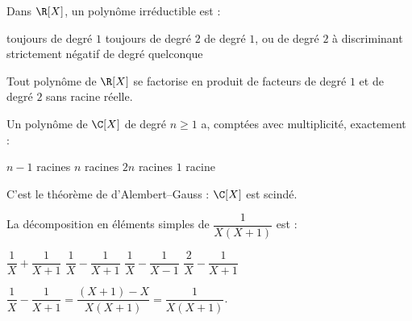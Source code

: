 \begin{question}
Dans $\R[X]$, un polynôme irréductible est :
\begin{reponses}
  \mauvaise toujours de degré $1$
  \mauvaise toujours de degré $2$
  \bonne de degré $1$, ou de degré $2$ à discriminant strictement négatif
  \mauvaise de degré quelconque
\end{reponses}
\begin{explication}
Tout polynôme de $\R[X]$ se factorise en produit de facteurs de degré $1$ et de degré $2$ sans racine réelle.
\end{explication}
\end{question}

\begin{question}
Un polynôme de $\C[X]$ de degré $n\ge1$ a, comptées avec multiplicité, exactement :
\begin{reponses}
  \mauvaise $n-1$ racines
  \bonne $n$ racines
  \mauvaise $2n$ racines
  \mauvaise $1$ racine
\end{reponses}
\begin{explication}
C'est le théorème de d'Alembert–Gauss : $\C[X]$ est scindé.
\end{explication}
\end{question}

\begin{question}
La décomposition en éléments simples de $\dfrac{1}{X(X+1)}$ est :
\begin{reponses}
  \mauvaise $\dfrac1X+\dfrac1{X+1}$
  \bonne $\dfrac1X-\dfrac1{X+1}$
  \mauvaise $\dfrac1X-\dfrac1{X-1}$
  \mauvaise $\dfrac2X-\dfrac1{X+1}$
\end{reponses}
\begin{explication}
$\dfrac1X-\dfrac1{X+1}=\dfrac{(X+1)-X}{X(X+1)}=\dfrac1{X(X+1)}$.
\end{explication}
\end{question}
